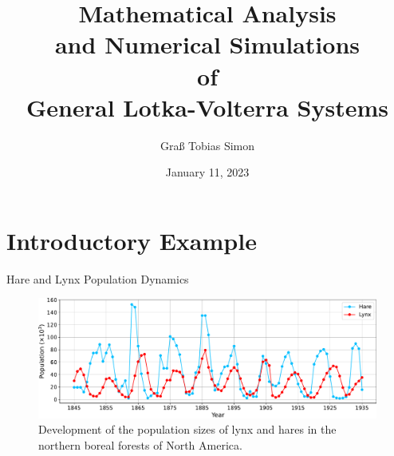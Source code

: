 \documentclass[10pt, dvipsnames]{beamer}
\title[Lotka-Volterra Models]{Mathematical Analysis\\ and Numerical Simulations\\ of\\General Lotka-Volterra Systems}
\author[Graß Tobias Simon]{Graß Tobias Simon}
\date{January 11, 2023}
\institute[University Vienna]{University of Vienna}
\begin{document}
\begin{frame}

\titlepage
\end{frame}

\section[Example]{Introductory Example}

\begin{frame}{Hare and Lynx Population Dynamics}

\begin{figure}
    \centering
    \includegraphics[width = \linewidth]{Grafiken/intro_example.pdf}
    \caption{Development of the population sizes of lynx and hares in the northern boreal forests of North America.}
    \label{fig:intial_example}
\end{figure}

\end{frame}
\end{document}
